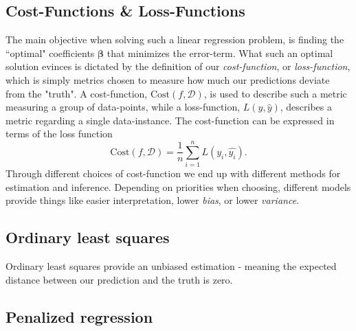 \subsection{Cost-Functions \& Loss-Functions}
The main objective when solving such a linear regression problem, is finding the ``optimal" coefficients $\boldsymbol{\beta}$ that minimizes the error-term.  
What such an optimal solution evinces is dictated by the definition of our \textit{cost-function},  or \textit{loss-function}, which is simply metrics chosen to measure how much our predictions deviate from the "truth". 
A cost-function, $\text{Cost}(f,\mathcal{D} )$, is used to describe such a metric measuring a group of data-points, while a loss-function, $L(y, \hat{y})$, describes a metric regarding a single data-instance. 
The cost-function can be expressed in terms of the loss function
\begin{equation}
\text{Cost}(f,\mathcal{D}) = \frac{1}{n}\sum_{i=1}^n L(y_i, \hat{y_i}).
\end{equation}
Through different choices of cost-function we end up with different methods for estimation and inference. 
Depending on priorities when choosing, different models provide things like easier interpretation, lower \textit{bias}, or lower \textit{variance}. 



\subsection{Ordinary least squares}
Ordinary least squares provide an unbiased estimation - meaning the expected distance between our prediction and the truth is zero. 

\subsection{Penalized regression}



